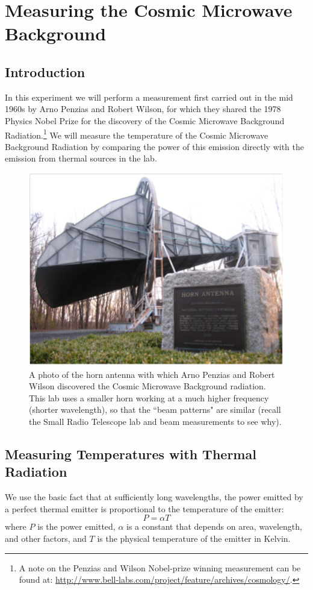 \chapter{Measuring the Cosmic Microwave Background}

\section*{Introduction}

In this experiment we will perform a measurement first carried out in the mid 1960s by Arno Penzias and Robert Wilson, for which they shared the 1978 Physics Nobel Prize for the discovery of the Cosmic Microwave Background Radiation.\footnote{A note on the Penzias and Wilson Nobel-prize winning measurement can be found at: \url{http://www.bell-labs.com/project/feature/archives/cosmology/}.}  We will measure the temperature of the Cosmic Microwave Background Radiation by comparing the  power of this emission directly with the emission from thermal sources in the lab. 

\begin{figure}[htbp]
	\begin{center}
		\includegraphics[width=.45\textwidth]{cmb/CMB-horn-antenna.pdf}
		\caption{A photo of the horn antenna with which Arno Penzias and Robert Wilson discovered the Cosmic Microwave Background radiation. This lab uses a smaller horn working at a much higher frequency (shorter wavelength), so that the ``beam patterns" are similar (recall the Small Radio Telescope lab and beam measurements to see why). }
		\label{fig:PW-horn}
	\end{center}
\end{figure}

\section{Measuring Temperatures with Thermal Radiation}

We use the basic fact that at sufficiently long wavelengths, the power emitted by a perfect thermal emitter is proportional to the temperature of the emitter:
\begin{equation}
P = \alpha T
\label{one}
\end{equation}
where $P$ is the power emitted, $\alpha$ is a constant that depends on area, wavelength, and other factors, and $T$ is the physical temperature of the emitter in Kelvin. 

